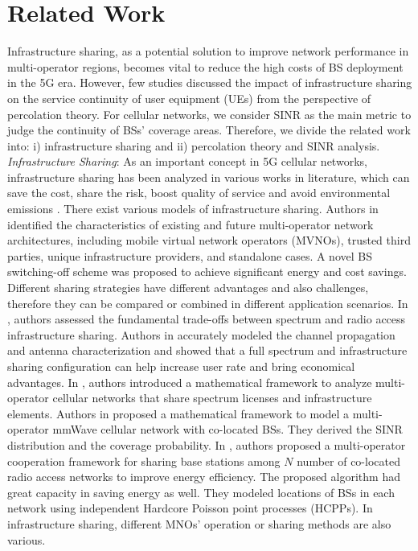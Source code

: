 \section{Related Work}
Infrastructure sharing, as a potential solution to improve network performance in multi-operator regions, becomes vital to reduce the high costs of BS deployment in the 5G era. However, few studies discussed the impact of infrastructure sharing on the service continuity of user equipment (UEs) from the perspective of percolation theory. For cellular networks, we consider SINR as the main metric to judge the continuity of BSs' coverage areas. Therefore, we divide the related work into: i) infrastructure sharing and ii) percolation theory and SINR analysis. \\
\indent \textit{Infrastructure Sharing}: As an important concept in 5G cellular networks, infrastructure sharing has been analyzed in various works in literature, which can save the cost, share the risk, boost quality of service and avoid environmental emissions \cite{dlamini2021remote}. There exist various models of infrastructure sharing. Authors in \cite{7105671} identified the characteristics of existing and future multi-operator network architectures, including mobile virtual network operators (MVNOs), trusted third parties, unique infrastructure providers, and standalone cases. A novel BS switching-off scheme was proposed to achieve significant energy and cost savings. Different sharing strategies have different advantages and also challenges, therefore they can be compared or combined in different application scenarios. 
In \cite{7343930}, authors assessed the fundamental trade-offs between spectrum and radio access infrastructure sharing. 
Authors in \cite{7562085} accurately modeled the channel propagation and antenna characterization and showed that a full spectrum and infrastructure sharing configuration can help increase user rate and bring economical advantages. 
In \cite{7500354}, authors introduced a mathematical framework to analyze multi-operator cellular networks that share spectrum licenses and infrastructure elements. Authors in \cite{8315130} proposed a mathematical framework to model a multi-operator mmWave cellular network with co-located BSs. They derived the SINR distribution and the coverage probability. 
In \cite{8594671}, authors proposed a multi-operator cooperation framework for sharing base stations among $N$ number of co-located radio access networks to improve energy efficiency. 
The proposed algorithm had great capacity in saving energy as well. They modeled locations of BSs in each network using independent Hardcore Poisson point processes (HCPPs). In infrastructure sharing, different MNOs' operation or sharing methods are also various.
